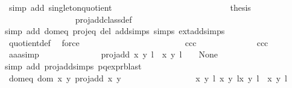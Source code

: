 \begin{isabellebody}
\ {\isacharparenleft}simp\ add{\isacharcolon}\ singleton{\isacharunderscore}quotient{\isacharparenright}\ \ \ \ \ \ \ \ \ \ \ \ \isanewline
\ \ \ \ \ \ \ \ \ \ \ \ \isamarkupfalse%
\ \isamarkupfalse%
\ {\isacharquery}thesis\isanewline
\ \ \ \ \ \ \ \ \ \ \ \ \ \ \isamarkupfalse%
\ {}\ proj{\isacharunderscore}add{\isacharunderscore}class{\isacharunderscore}def\ \isamarkupfalse%
{\isacharparenleft}simp\ add{\isacharcolon}\ dom{\isacharunderscore}eq\ proj{\isacharunderscore}eq\ del{\isacharcolon}\ add{\isachardot}simps\ {\isasymtau}{\isachardot}simps\ ext{\isacharunderscore}add{\isachardot}simps{\isacharparenright}\isanewline
\ \ \ \ \ \ \ \ \ \ \ \ \ \ \isamarkupfalse%
\ quotient{\isacharunderscore}def\ \isamarkupfalse%
\ force\isanewline
\ \ \ \ \ \ \ \ \ \ \isamarkupfalse%
\isanewline
\ \ \ \ \ \ \ \ \ \ \ \ \isamarkupfalse%
\ ccc\isanewline
\ \ \ \ \ \ \ \ \ \ \ \ \isamarkupfalse%
\ ccc\ \isamarkupfalse%
\ aaa{\isacharunderscore}simp{\isacharcolon}\isanewline
\ \ \ \ \ \ \ \ \ \ \ \ \ \ {\isachardoublequoteopen}proj{\isacharunderscore}add\ {\isacharparenleft}{\isacharparenleft}x{\isacharcomma}\ y{\isacharparenright}{\isacharcomma}\ l{\isacharparenright}\ {\isacharparenleft}{\isasymtau}\ {\isacharparenleft}x{\isacharprime}{\isacharcomma}\ y{\isacharprime}{\isacharparenright}{\isacharcomma}\ l{\isacharprime}\ {\isacharplus}\ {}{\isacharparenright}\ {\isacharequal}\ None{\isachardoublequoteclose}\isanewline
\ \ \ \ \ \ \ \ \ \ \ \ \ \ \isamarkupfalse%
{\isacharparenleft}simp\ add{\isacharcolon}\ proj{\isacharunderscore}add{\isachardot}simps\ p{\isacharunderscore}q{\isacharunderscore}expr{\isacharparenleft}{}{\isacharparenright}{\isacharcomma}blast{\isacharparenright}\isanewline
\ \ \ \ \ \ \ \ \ \ \ \ \isamarkupfalse%
\ \isamarkupfalse%
\ dom{\isacharunderscore}eq{\isacharcolon}\ {\isachardoublequoteopen}{\isacharparenleft}dom\ {\isacharparenleft}{\isasymlambda}{\isacharparenleft}x{\isacharcomma}\ y{\isacharparenright}{\isachardot}\ proj{\isacharunderscore}add\ x\ y{\isacharparenright}\ {\isasyminter}\isanewline
\ \ \ \ \ \ \ \ \ \ \ \ \ \ \ \ {\isacharbraceleft}{\isacharparenleft}{\isacharparenleft}{\isacharparenleft}x{\isacharcomma}\ y{\isacharparenright}{\isacharcomma}\ l{\isacharparenright}{\isacharcomma}\ {\isacharparenleft}x{\isacharprime}{\isacharcomma}\ y{\isacharprime}{\isacharparenright}{\isacharcomma}\ l{\isacharprime}{\isacharparenright}{\isacharcomma}{\isacharparenleft}{\isacharparenleft}{\isacharparenleft}x{\isacharcomma}\ y{\isacharparenright}{\isacharcomma}\ l{\isacharparenright}{\isacharcomma}\ {\isasymtau}\ {\isacharparenleft}x{\isacharprime}{\isacharcomma}\ y{\isacharprime}{\isacharparenright}{\isacharcomma}\ l{\isacharprime}\ {\isacharplus}\ {}{\isacharparenright}{\isacharbraceright}{\isacharparenright}\ {\isacharequal}\ \isanewline

\end{isabellebody}
